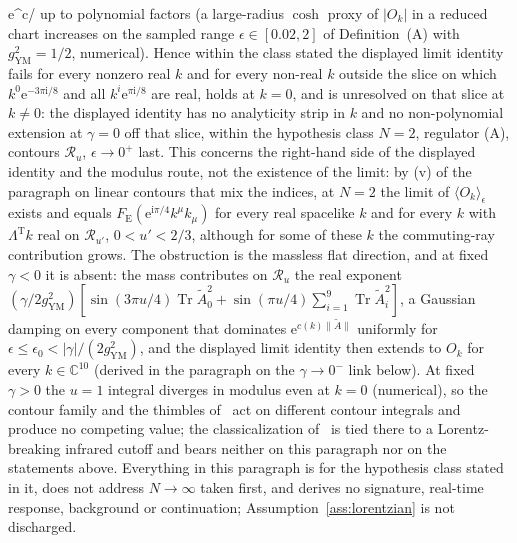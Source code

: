 e^{c/\epsilon}\) up to polynomial factors (a large-radius \(\cosh\) proxy of \(|O_k|\) in a reduced chart increases on the sampled range \(\epsilon\in[0.02,2]\) of Definition~(A) with \(g_{\mathrm{YM}}^2=1/2\), numerical). Hence within the class stated the displayed limit identity fails for every nonzero real \(k\) and for every non-real \(k\) outside the slice on which \(k^0\mathrm e^{-3\pi\mathrm i/8}\) and all \(k^i\mathrm e^{\pi\mathrm i/8}\) are real, holds at \(k=0\), and is unresolved on that slice at \(k\ne0\): the displayed identity has no analyticity strip in \(k\) and no non-polynomial extension at \(\gamma=0\) off that slice, within the hypothesis class \(N=2\), regulator (A), contours \(\mathcal R_u\), \(\epsilon\to0^+\) last. This concerns the right-hand side of the displayed identity and the modulus route, not the existence of the limit: by (v) of the paragraph on linear contours that mix the indices, at \(N=2\) the limit of \(\langle O_k\rangle_\epsilon\) exists and equals \(F_{\mathrm E}(\mathrm e^{\mathrm i\pi/4}k^\mu k_\mu)\) for every real spacelike \(k\) and for every \(k\) with \(\Lambda^{\mathrm T}k\) real on \(\mathcal R_{u'}\), \(0<u'<2/3\), although for some of these \(k\) the commuting-ray contribution grows. The obstruction is the massless flat direction, and at fixed \(\gamma<0\) it is absent: the mass contributes on \(\mathcal R_u\) the real exponent \((\gamma/2g_{\mathrm{YM}}^2)[\sin(3\pi u/4)\operatorname{Tr}\tilde A_0^2+\sin(\pi u/4)\sum_{i=1}^{9}\operatorname{Tr}\tilde A_i^2]\), a Gaussian damping on every component that dominates \(\mathrm e^{c(k)\|\tilde A\|}\) uniformly for \(\epsilon\le\epsilon_0<|\gamma|/(2g_{\mathrm{YM}}^2)\), and the displayed limit identity then extends to \(O_k\) for every \(k\in\mathbb C^{10}\) (derived in the paragraph on the \(\gamma\to0^-\) link below). At fixed \(\gamma>0\) the \(u=1\) integral diverges in modulus even at \(k=0\) (numerical), so the contour family and the thimbles of~\cite{ChouNishimuraTripathi2025} act on different contour integrals and produce no competing value; the classicalization of~\cite{AsanoNishimuraPiensukYamamori2025} is tied there to a Lorentz-breaking infrared cutoff and bears neither on this paragraph nor on the statements above. Everything in this paragraph is for the hypothesis class stated in it, does not address \(N\to\infty\) taken first, and derives no signature, real-time response, background or continuation; Assumption~\ref{ass:lorentzian} is not discharged.


